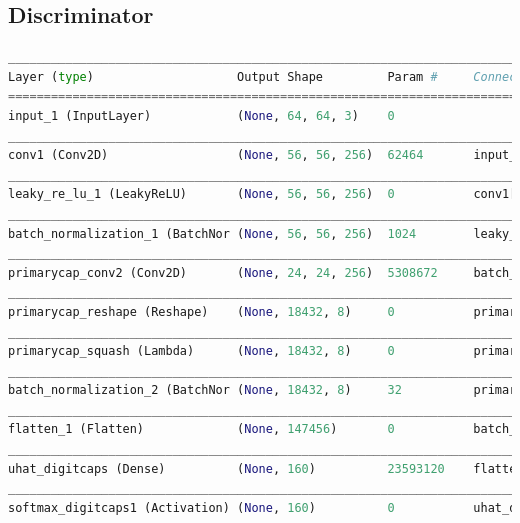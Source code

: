\subsection{Discriminator} %
\label{sub:discriminator}
\begin{lstlisting}[basicstyle=\scriptsize,language=Python]
__________________________________________________________________________________________________
Layer (type)                    Output Shape         Param #     Connected to                     
==================================================================================================
input_1 (InputLayer)            (None, 64, 64, 3)    0                                            
__________________________________________________________________________________________________
conv1 (Conv2D)                  (None, 56, 56, 256)  62464       input_1[0][0]                    
__________________________________________________________________________________________________
leaky_re_lu_1 (LeakyReLU)       (None, 56, 56, 256)  0           conv1[0][0]                      
__________________________________________________________________________________________________
batch_normalization_1 (BatchNor (None, 56, 56, 256)  1024        leaky_re_lu_1[0][0]              
__________________________________________________________________________________________________
primarycap_conv2 (Conv2D)       (None, 24, 24, 256)  5308672     batch_normalization_1[0][0]      
__________________________________________________________________________________________________
primarycap_reshape (Reshape)    (None, 18432, 8)     0           primarycap_conv2[0][0]           
__________________________________________________________________________________________________
primarycap_squash (Lambda)      (None, 18432, 8)     0           primarycap_reshape[0][0]         
__________________________________________________________________________________________________
batch_normalization_2 (BatchNor (None, 18432, 8)     32          primarycap_squash[0][0]          
__________________________________________________________________________________________________
flatten_1 (Flatten)             (None, 147456)       0           batch_normalization_2[0][0]      
__________________________________________________________________________________________________
uhat_digitcaps (Dense)          (None, 160)          23593120    flatten_1[0][0]                  
__________________________________________________________________________________________________
softmax_digitcaps1 (Activation) (None, 160)          0           uhat_digitcaps[0][0]             

\end{lstlisting}

